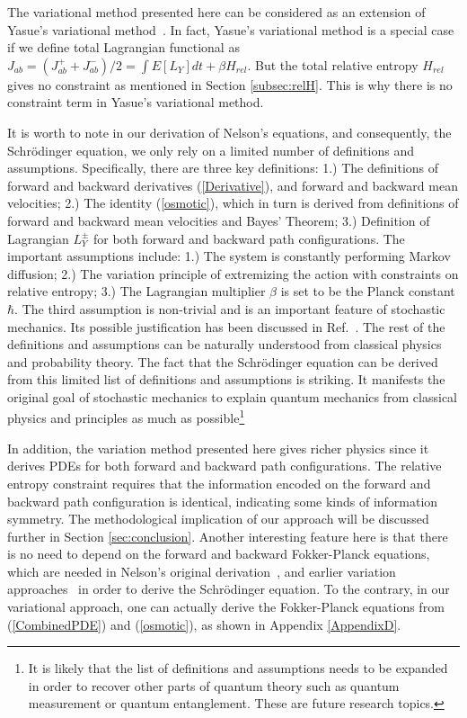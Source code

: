 \documentclass[%
 aip, 
 amsmath,amssymb,amsthm,
 nofootinbib,
 reprint,
]{revtex4-1}
\begin{document}
The variational method presented here can be considered as an extension of Yasue's variational method~\cite{Yasue}. In fact, Yasue's variational method is a special case if we define total Lagrangian functional as $J_{ab} = (J_{ab}^++J_{ab}^-)/2 = \int E[L_Y]dt + \beta H_{rel}$. But the total relative entropy $H_{rel}$ gives no constraint as mentioned in Section \ref{subsec:relH}. This is why there is no constraint term in Yasue's variational method. 

It is worth to note in our derivation of Nelson's equations, and consequently, the Schr\"{o}dinger equation, we only rely on a limited number of definitions and assumptions. Specifically, there are three key definitions: 1.) The definitions of forward and backward derivatives (\ref{Derivative}), and forward and backward mean velocities; 2.) The identity (\ref{osmotic}), which in turn is derived from definitions of forward and backward mean velocities and Bayes' Theorem; 3.) Definition of Lagrangian $L_Y^{\pm}$ for both forward and backward path configurations. The important assumptions include: 1.) The system is constantly performing Markov diffusion; 2.) The variation principle of extremizing the action with constraints on relative entropy; 3.) The Lagrangian multiplier $\beta$ is set to be the Planck constant $\hbar$. The third assumption is non-trivial and is an important feature of stochastic mechanics. Its possible justification has been discussed in Ref.~\cite{Cetto, Pena}. The rest of the definitions and assumptions can be naturally understood from classical physics and probability theory. The fact that the Schr\"{o}dinger equation can be derived from this limited list of definitions and assumptions is striking. It manifests the original goal of stochastic mechanics to explain quantum mechanics from classical physics and principles as much as possible\footnote{It is likely that the list of definitions and assumptions needs to be expanded in order to recover other parts of quantum theory such as quantum measurement or quantum entanglement. These are future research topics.}

In addition, the variation method presented here gives richer physics since it derives PDEs for both forward and backward path configurations. The relative entropy constraint requires that the information encoded on the forward and backward path configuration is identical, indicating some kinds of information symmetry. The methodological implication of our approach will be discussed further in Section \ref{sec:conclusion}. Another interesting feature here is that there is no need to depend on the forward and backward Fokker-Planck equations, which are needed in Nelson's original derivation~\cite{Nelson}, and earlier variation approaches~\cite{Yasue, Guerra, Pavon, Caticha} in order to derive the Schr\"{o}dinger equation. To the contrary, in our variational approach, one can actually derive the Fokker-Planck equations from (\ref{CombinedPDE}) and (\ref{osmotic}), as shown in Appendix \ref{AppendixD}.
\end{document}
